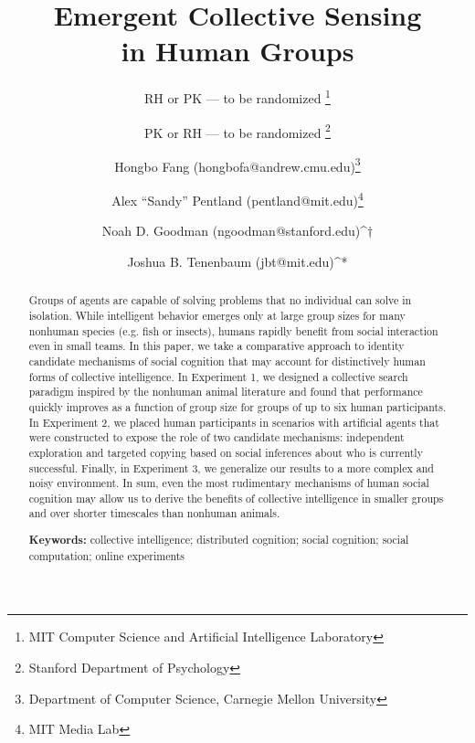 \documentclass[12pt,letterpaper]{article}
\title{Emergent Collective Sensing \\in Human Groups}
\author{
RH or PK --- to be randomized \thanks{MIT Computer Science and Artificial Intelligence Laboratory}
\vspace{-.5em}
\and 
PK or RH --- to be randomized \thanks{Stanford Department of Psychology}
\vspace{-.5em}
\and 
Hongbo Fang (hongbofa@andrew.cmu.edu)\thanks{Department of Computer Science, Carnegie Mellon University}
\vspace{-.5em}
\and
Alex ``Sandy'' Pentland (pentland@mit.edu)\thanks{MIT Media Lab}
\and 
Noah D. Goodman (ngoodman@stanford.edu)^$\dagger$
\and 
Joshua B. Tenenbaum (jbt@mit.edu)^*}
\date{}
\begin{document}
\maketitle
\vspace{-2em}

\begin{abstract}

Groups of agents are capable of solving problems that no individual can solve in isolation. 
While intelligent behavior emerges only at large group sizes for many nonhuman species (e.g. fish or insects), humans rapidly benefit from social interaction even in small teams. 
In this paper, we take a comparative approach to identity candidate  mechanisms of social cognition that may account for distinctively human forms of collective intelligence. 
In Experiment 1, we designed a collective search paradigm inspired by the nonhuman animal literature and found that performance quickly improves as a function of group size for groups of up to six human participants.
In Experiment 2, we placed human participants in scenarios with artificial agents that were constructed to expose the role of two candidate mechanisms: independent exploration and targeted copying based on social inferences about who is currently successful. 
Finally, in Experiment 3, we generalize our results to a more complex and noisy environment. 
In sum, even the most rudimentary mechanisms of human social cognition may allow us to derive the benefits of collective intelligence in smaller groups and over shorter timescales than nonhuman animals.

\textbf{Keywords:}
  collective intelligence; distributed cognition;
  social cognition; social computation; online experiments
\end{abstract}
\end{document}
